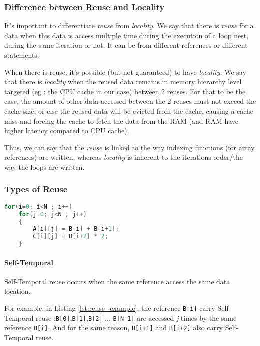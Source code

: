 \documentclass[paper=a4, fontsize=11pt]{scrartcl}
\numberwithin{equation}{section}        %
\numberwithin{figure}{section}          %
\numberwithin{table}{section}               %
\begin{document}
        \subsubsection{Difference between Reuse and Locality}
            It's important to differentiate \textit{reuse} from \textit{locality}.
            We say that there is \textit{reuse} for a data when this data is
            access multiple time during the execution of a loop nest, during
            the same iteration or not. It can be from different references or different statements.
            
            When there is reuse, it's possible (but not guaranteed) to have
            \textit{locality}. We say that there is \textit{locality} when the
            reused data remains in memory hierarchy level targeted 
            (eg : the CPU cache in our case) between 2 reuses.
            For that to be the case, the amount of other data accessed between the
            2 reuses must not exceed the cache size, or else the reused data will be
            evicted from the cache, causing a cache miss and forcing the cache
            to fetch the data from the RAM (and RAM have higher latency compared to CPU cache).


            Thus, we can say that the \textit{reuse} is linked to the way indexing
            functions (for array references) are written, whereas \textit{locality} is
            inherent to the iterations order/the way the loops are written.

        \subsubsection{Types of Reuse}
            
\begin{lstlisting}[frame=single, language=C, caption=Reuse example, label={lst:reuse_example}]
for(i=0; i<N ; i++)
    for(j=0; j<N ; j++)
    {
        A[i][j] = B[i] + B[i+1];
        C[i][j] = B[i+2] * 2;
    }
\end{lstlisting}

            \paragraph{Self-Temporal}
                Self-Temporal reuse occurs when the same reference access the same
                data location.
                
                For example, in Listing \ref{lst:reuse_example}, the reference \verb'B[i]' carry Self-Temporal
                reuse :\verb'B[0]',\verb'B[1]',\verb'B[2]' ... \verb'B[N-1]' are accessed
                \textit{j} times by the same reference \verb'B[i]'.
                And for the same reason, \verb'B[i+1]' and \verb'B[i+2]' also carry Self-Temporal reuse.
\end{document}
